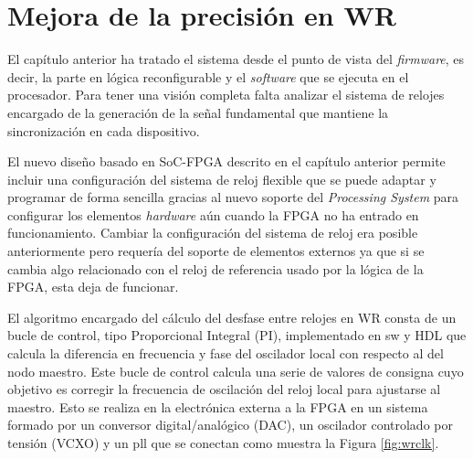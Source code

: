\chapter{Mejora de la precisión en WR} \label{cap:reloj}

El capítulo anterior ha tratado el sistema desde el punto de vista del 
\textit{firmware}, es decir, la parte en lógica reconfigurable y el 
\textit{software} que se ejecuta en el procesador. Para tener una visión 
completa falta analizar el sistema de relojes encargado de la generación de la 
señal fundamental que mantiene la sincronización en cada dispositivo.

El nuevo diseño basado en SoC-FPGA descrito en el capítulo anterior permite 
incluir una configuración del sistema de reloj flexible que se puede adaptar y 
programar de forma sencilla gracias al nuevo soporte del \textit{Processing 
System} para configurar los elementos \textit{hardware} aún cuando la FPGA no 
ha entrado en funcionamiento. Cambiar la configuración del sistema de reloj era 
posible anteriormente pero requería del soporte de elementos externos ya que si 
se cambia algo relacionado con el reloj de referencia usado por la lógica de la 
FPGA, esta deja de funcionar. 

El algoritmo encargado del cálculo del desfase entre relojes en WR consta de un 
bucle de control, tipo Proporcional Integral (PI), implementado 
en sw y HDL que calcula la 
diferencia en frecuencia y fase del oscilador local con respecto al del nodo 
maestro. Este bucle de control calcula una serie de valores de consigna cuyo 
objetivo es corregir la frecuencia de oscilación del reloj local para ajustarse 
al maestro. Esto se realiza en la electrónica externa a la FPGA en un sistema 
formado por un conversor digital/analógico (DAC), un oscilador controlado por 
tensión (VCXO) y un \gls{pll} que se conectan como muestra la Figura 
\ref{fig:wrclk}.


